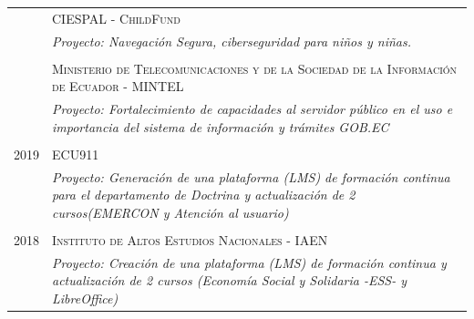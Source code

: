 \documentclass[a4paper]{article}
\begin{document}
\begin{longtable}{r|p{12cm}}

\textsc{2019} &  \textsc{Ministerio de Telecomunicaciones y de la Sociedad de la Información de Ecuador - MINTEL} \\&\emph{Proyecto: Fortalecimiento de capacidades al servidor público en el uso e importancia del sistema de información y trámites GOB.EC}\\\multicolumn{2}{c}{} \\

\textsc{2019} &  \textsc{ECU911} \\&\emph{Proyecto: Generación de una plataforma (LMS) de formación continua para el departamento de Doctrina y actualización de 2 cursos(EMERCON y Atención al usuario)}\\\multicolumn{2}{c}{} \\

\textsc{2018} &  \textsc{Instituto de Altos Estudios Nacionales - IAEN} \\&\emph{Proyecto: Creación de una plataforma (LMS) de formación continua y actualización de 2 cursos (Economía Social y Solidaria -ESS- y LibreOffice)}\\

\end{longtable}

\end{document}
